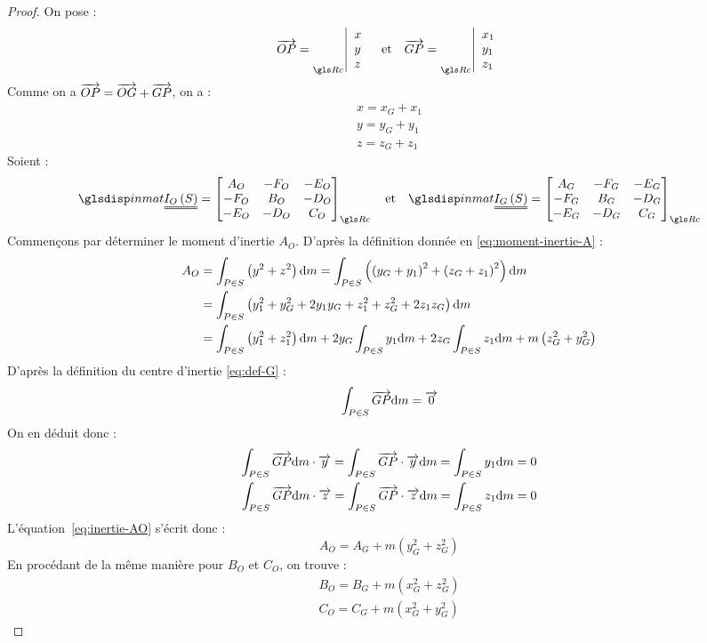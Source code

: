 \begin{proof}
	On pose :
	\begin{equation*}
		\vect{OP}=\coords{x}{y}{z} \quad \text{et} \quad \vect{GP}=\coords{x_1}{y_1}{z_1}
	\end{equation*}
	Comme on a $\overrightarrow{OP}=\overrightarrow{OG}+\overrightarrow{GP}$, on a :
	\begin{subequations}
		\begin{align}
			x=x_G+x_1\\
			y=y_G+y_1\\
			z=z_G+z_1
		\end{align}
	\end{subequations}
	Soient :
	\begin{equation*}
		\inmat{S}=\incomp{A_O}{B_O}{C_O}{D_O}{E_O}{F_O}
		\quad
		\text{et}
		\quad
		\inmat[G]{S}=\incomp{A_G}{B_G}{C_G}{D_G}{E_G}{F_G}
	\end{equation*}
	Commençons par déterminer le moment d'inertie $A_O$. D'après la définition donnée en \eqref{eq:moment-inertie-A} :
	\begin{align}
		A_O	&=\int_{P\in S}\left(y^2+z^2\right)\mathrm{d}m=\int_{P\in S}\left(\left(y_G+y_1\right)^2+\left(z_G+z_1\right)^2\right)\mathrm{d}m\\
			&=\int_{P\in S}\left(y_1^2+y_G^2+2y_1y_G+z_1^2+z_G^2+2z_1z_G\right)\mathrm{d}m\\
			&=\int_{P\in S}\left(y_1^2+z_1^2\right)\mathrm{d}m+2y_G\int_{P\in S}y_1\mathrm{d}m+2z_G\int_{P\in S}z_1\mathrm{d}m+m\left(z_G^2+y_G^2\right)
			\label{eq:inertie-AO}
	\end{align}
	D'après la définition du centre d'inertie \eqref{eq:def-G} :
		\begin{equation*}
			\int_{P\in S}\overrightarrow{GP}\mathrm{d}m=\overrightarrow{0}
		\end{equation*}
	On en déduit donc :
		\begin{subequations}
			\begin{align}
				\int_{P\in S}\overrightarrow{GP}\mathrm{d}m\cdot\overrightarrow{y}=\int_{P\in S}\overrightarrow{GP}\cdot\overrightarrow{y}\mathrm{d}m=\int_{P\in S}y_1\mathrm{d}m=0\\
				\int_{P\in S}\overrightarrow{GP}\mathrm{d}m\cdot\overrightarrow{z}=\int_{P\in S}\overrightarrow{GP}\cdot\overrightarrow{z}\mathrm{d}m=\int_{P\in S}z_1\mathrm{d}m=0
			\end{align}
		\end{subequations}
	L'équation~\eqref{eq:inertie-AO} s'écrit donc :
	\begin{equation*}
		A_O=A_G+m\left(y_G^2+z_G^2\right)
	\end{equation*}
	En procédant de la même manière pour $B_O$ et $C_O$, on trouve :
	\begin{subequations}
		\begin{align}
			B_O=B_G+m\left(x_G^2+z_G^2\right)\\		
			C_O=C_G+m\left(x_G^2+y_G^2\right)	
		\end{align}
	\end{subequations}	
	

\end{proof}
